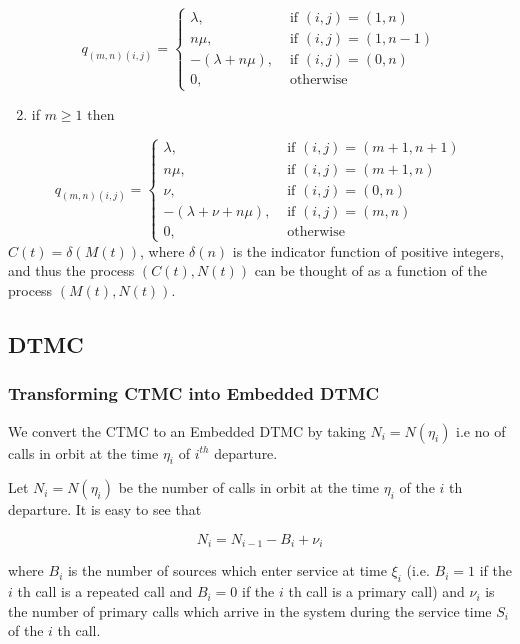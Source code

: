 \documentclass[10pt]{article}
\begin{document}
$$
q_{(m, n)(i, j)}=\left\{\begin{array}{cl}
\lambda, & \text { if }(i, j)=(1, n) \\
n \mu, & \text { if }(i, j)=(1, n-1) \\
-(\lambda+n \mu), & \text { if }(i, j)=(0, n) \\
0, & \text { otherwise }
\end{array}\right.
$$

\begin{enumerate}
  \setcounter{enumi}{1}
  \item if $m \geq 1$ then
\end{enumerate}

$$
q_{(m, n)(i, j)}=\left\{\begin{array}{cl}
\lambda, & \text { if }(i, j)=(m+1, n+1) \\
n \mu, & \text { if }(i, j)=(m+1, n) \\
\nu, & \text { if }(i, j)=(0, n) \\
-(\lambda+\nu+n \mu), & \text { if }(i, j)=(m, n) \\
0, & \text { otherwise }
\end{array}\right.
$$
$C(t)=\delta(M(t))$, where $\delta(n)$ is the indicator function of positive integers, and thus the process $(C(t), N(t))$ can be thought of as a function of the process $(M(t), N(t))$.

\subsection{DTMC}
\subsubsection{Transforming CTMC into Embedded DTMC}
We convert the CTMC to an Embedded DTMC by taking $N_i=N(\eta_i)$ i.e no of calls in orbit at the time $\eta_i$ of $i^{th}$ departure. 

Let $N_{i}=N\left(\eta_{i}\right)$ be the number of calls in orbit at the time $\eta_{i}$ of the $i$ th departure. It is easy to see that


\begin{equation*}
N_{i}=N_{i-1}-B_{i}+\nu_{i} 
\end{equation*}


where $B_{i}$ is the number of sources which enter service at time $\xi_{i}$ (i.e. $B_{i}=1$ if the $i$ th call is a repeated call and $B_{i}=0$ if the $i$ th call is a primary call) and $\nu_{i}$ is the number of primary calls which arrive in the system during the service time $S_{i}$ of the $i$ th call.
\end{document}
